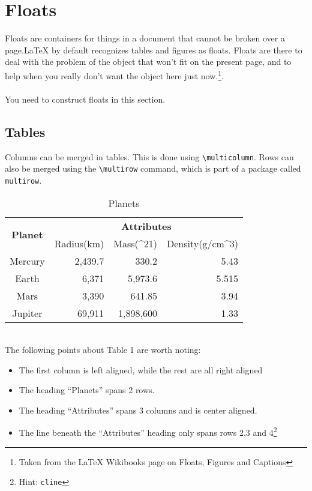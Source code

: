 \documentclass{article}
\begin{document}
\section{Floats}
Floats are containers for things in a document that cannot be broken over a
page.{\LaTeX} by default recognizes tables and figures as floats. Floats are there
to deal with the problem of the object that won’t fit on the present page, and
to help when you really don’t want the object here just now.\footnote{Taken from the {\LaTeX} Wikibooks page on Floats, Figures and Captions}.
\paragraph{}
You need to construct floats in this section.
\subsection{Tables}
Columns can be merged in tables. This is done using \verb#\multicolumn#. Rows can also be merged using the \verb#\multirow# command, which is part of a package called \texttt{multirow}.\\
\begin{table}[h]
\begin{center}
\begin{tabular}{|c|r|r|r|}\hline
\multirow{2}{*}{\textbf{Planet}} & \multicolumn{3}{|c|}{\textbf{Attributes}}\\
\cline{2-4}
&  Radius(km) & Mass(\times10^{21}) & Density(g/cm^{3})\\\hline
Mercury & 2,439.7 & 330.2 & 5.43\\
Earth & 6,371 & 5,973.6 & 5.515\\
Mars & 3,390 & 641.85 & 3.94\\
Jupiter & 69,911 & 1,898,600 & 1.33\\\hline
\end{tabular}
\caption{Planets}
\end{center}
\end{table}\\
The following points about Table 1 are worth noting:\\
\begin{itemize}
\item The first column is left aligned, while the rest are all right aligned
\item The heading ``Planets'' spans 2 rows.
\item The heading ``Attributes'' spans 3 columns and is center aligned.
\item The line beneath the ``Attributes'' heading only spans rows 2,3 and 4\footnote{Hint: \texttt{cline}}
\end{itemize} 
\end{document}
